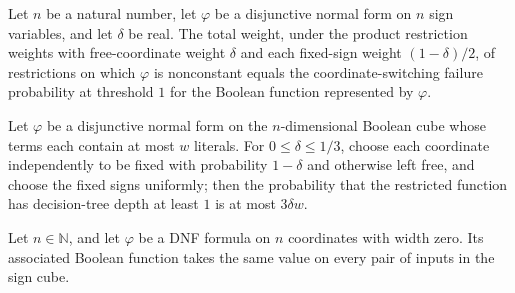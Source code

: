 \begin{theorem}
\label{FABL.DNFFormula.badRestrictionWeight_eq_coordSwitchingFailureProbability}
\leanok
{}
Let $n$ be a natural number, let $\varphi$ be a disjunctive normal form on $n$ sign
variables, and let $\delta$ be real. The total weight, under the product restriction
weights with free-coordinate weight $\delta$ and each fixed-sign weight $(1-\delta)/2$,
of restrictions on which $\varphi$ is nonconstant equals the coordinate-switching
failure probability at threshold $1$ for the Boolean function represented by $\varphi$.
\end{theorem}

\begin{theorem}
\label{FABL.exercise4_19_switchingFailureProbability}
\leanok
{}
Let $\varphi$ be a disjunctive normal form on the $n$-dimensional Boolean cube whose
terms each contain at most $w$ literals. For $0\leq\delta\leq 1/3$, choose each
coordinate independently to be fixed with probability $1-\delta$ and otherwise left
free, and choose the fixed signs uniformly; then the probability that the restricted
function has decision-tree depth at least $1$ is at most $3\delta w$.
\end{theorem}

\begin{theorem}
\label{FABL.DNFFormula.toBooleanFunction_eq_of_width_eq_zero}
\leanok
{}
Let $n\in\mathbb{N}$, and let $\varphi$ be a DNF formula on $n$ coordinates with width
zero. Its associated Boolean function takes the same value on every pair of inputs in
the sign cube.
\end{theorem}

